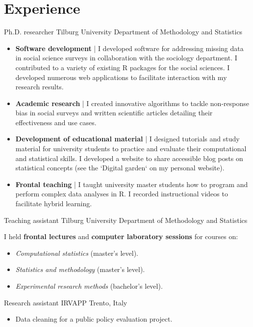 \section{Experience}

{Ph.D. researcher}
{Tilburg University} %
{} %
{Department of Methodology and Statistics}   %
{
    \vspace{0.1em}
    \begin{spacing}{1.1}
    \begin{itemize}
        \item \textbf{Software development} | I developed software for addressing missing data in social science surveys in collaboration with the sociology department. I contributed to a variety of existing R packages for the social sciences. I developed numerous web applications to facilitate interaction with my research results.
        \item \textbf{Academic research} | I created innovative algorithms to tackle non-response bias in social surveys and written scientific articles detailing their effectiveness and use cases.
        \item \textbf{Development of educational material} | I designed tutorials and study material for university students to practice and evaluate their computational and statistical skills. I developed a website to share accessible blog posts on statistical concepts (see the `Digital garden` on my personal website).
        \item \textbf{Frontal teaching} | I taught university master students how to program and perform complex data analyses in R. I recorded instructional videos to facilitate hybrid learning.
    \end{itemize}
    \end{spacing}
    \vspace{1em}
}

{Teaching assistant}
{Tilburg University} %
{} %
{Department of Methodology and Statistics}   %
{
    \vspace{0.1em}
    \begin{spacing}{1.1}
    I held \textbf{frontal lectures} and \textbf{computer laboratory sessions} for courses on:
    \begin{itemize}
        \item \textit{Computational statistics} (master's level).
		\item \textit{Statistics and methodology} (master's level).
		\item \textit{Experimental research methods} (bachelor's level).
    \end{itemize}
    \end{spacing}
    \vspace{1em}
}

{Research assistant}
{IRVAPP} %
{Trento, Italy} %
{}   %
{
    \vspace{0.1em}
    \begin{itemize}
        \item Data cleaning for a public policy evaluation project.
    \end{itemize}
}

